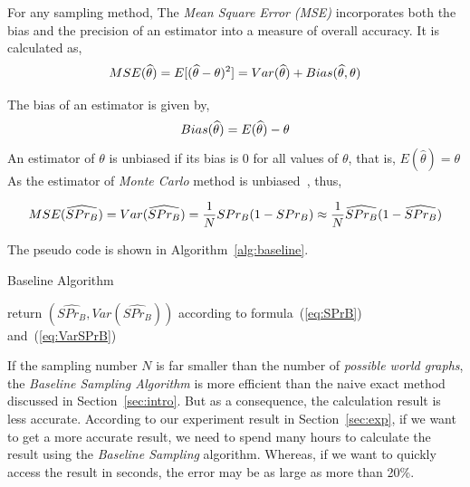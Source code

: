 \documentclass[runningheads,a4paper]{llncs}
\begin{document}
For any sampling method, The \emph{Mean Square Error} \emph{(MSE)} incorporates both the bias and the precision of an estimator into a measure of overall accuracy. It is calculated as,
\vspace{-0.2cm}
\[
MSE(\widehat{\theta})=E[(\widehat{\theta}-\theta)^2]=Var(\widehat{\theta})+Bias(\widehat{\theta},\theta)
\vspace{-0.2cm}
\]

The bias of an estimator is given by,
\vspace{-0.2cm}
\[
Bias(\widehat{\theta})=E(\widehat{\theta})-\theta
\vspace{-0.2cm}
\]
An estimator of $\theta$ is unbiased if its bias is $0$ for all values of $\theta$, that is, $E(\widehat{\theta})=\theta$
As the estimator of \emph{Monte Carlo} method is unbiased~\cite{fishman1991monte}, thus,

\vspace{-0.4cm}
{\setlength\arraycolsep{2pt}
\begin{eqnarray}
\label{eq:VarSPrB}
  MSE(\widehat{SPr_B}) = Var(\widehat{SPr_B}) =\frac{1}{N}SPr_B(1-SPr_B)\approx\frac{1}{N}\widehat{SPr_B}(1-\widehat{SPr_B})
\vspace{-0.4cm}
\end{eqnarray}
}

\vspace{-0.4cm}
The pseudo code is shown in Algorithm~\ref{alg:baseline}.

\vspace{-0.6cm}
\begin{algorithm}[htbp]
  \small{
  \caption{\small{Baseline Algorithm}}
  \label{alg:baseline}
  \label{code:s1e}
  return $(\widehat{SPr_B},Var(\widehat{SPr_B}))$ according to formula~(\ref{eq:SPrB}) and~(\ref{eq:VarSPrB})\;}
\end{algorithm}
\vspace{-0.6cm}

If the sampling number $N$ is far smaller than the number of \emph{possible world graphs}, the \emph{Baseline Sampling Algorithm} is more efficient than the naive exact method discussed in Section~\ref{sec:intro}. But as a consequence, the calculation result is less accurate. According to our experiment result in Section~\ref{sec:exp}, if we want to get a more accurate result, we need to spend many hours to calculate the result using the \emph{Baseline Sampling} algorithm. Whereas, if we want to quickly access the result in seconds, the error may be as large as more than 20\%.
\end{document}
